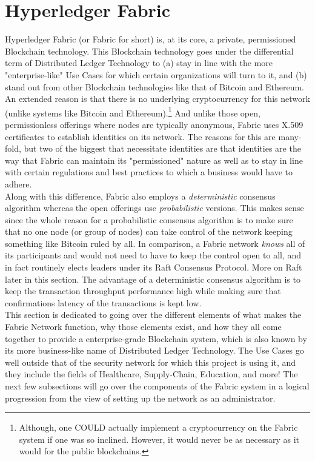 \section{Hyperledger Fabric}
	\hspace{10mm}Hyperledger Fabric (or Fabric for short) is, at its core, a private, permissioned Blockchain technology. This Blockchain technology goes under the differential term of Distributed Ledger Technology to (a) stay in line with the more "enterprise-like" Use Cases for which certain organizations will turn to it, and (b) stand out from other Blockchain technologies like that of Bitcoin and Ethereum. An extended reason is that there is no underlying cryptocurrency for this network (unlike systems like Bitcoin and Ethereum).\footnote{Although, one COULD actually implement a cryptocurrency on the Fabric system if one was so inclined. However, it would never be as necessary as it would for the public blockchains.} And unlike those open, permissionless offerings where nodes are typically anonymous, Fabric uses X.509 certificates to establish identities on its network. The reasons for this are many-fold, but two of the biggest that necessitate identities are that identities are the way that Fabric can maintain its "permissioned" nature as well as to stay in line with certain regulations and best practices to which a business would have to adhere.\\
	
	\hspace{10mm}Along with this difference, Fabric also employs a \textit{deterministic} consensus algorithm whereas the open offerings use \textit{probabilistic} versions. This makes sense since the whole reason for a probabilistic consensus algorithm is to make sure that no one node (or group of nodes) can take control of the network keeping something like Bitcoin ruled by all. In comparison, a Fabric network \textit{knows} all of its participants and would not need to have to keep the control open to all, and in fact routinely elects leaders under its Raft Consensus Protocol. More on Raft later in this section. The advantage of a deterministic consensus algorithm is to keep the transaction throughput performance high while making sure that confirmations latency of the transactions is kept low.\\
	
	\hspace{10mm}This section is dedicated to going over the different elements of what makes the Fabric Network function, why those elements exist, and how they all come together to provide a enterprise-grade Blockchain system, which is also known by its more business-like name of Distributed Ledger Technology. The Use Cases go well outside that of the security network for which this project is using it, and they include the fields of Healthcare, Supply-Chain, Education, and more! The next few subsections will go over the components of the Fabric system in a logical progression from the view of setting up the network as an administrator.\\
		
